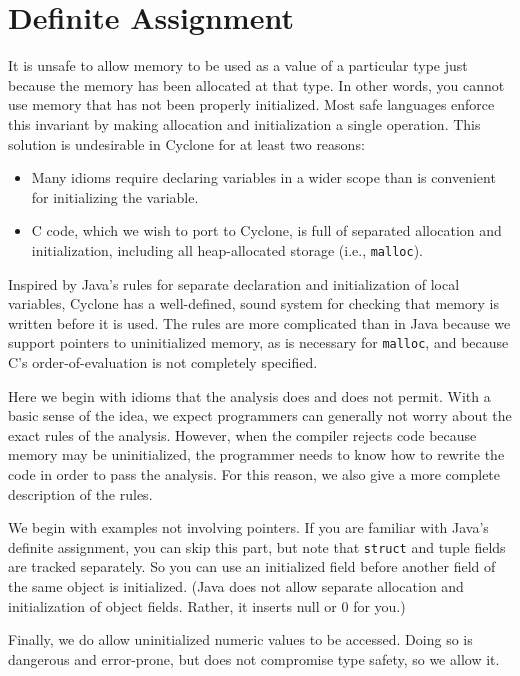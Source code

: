 \section{Definite Assignment}
\label{sec:definite}
 
It is unsafe to allow memory to be used as a value of a particular
type just because the memory has been allocated at that type.  In
other words, you cannot use memory that has not been properly
initialized.  Most safe languages enforce this invariant by making
allocation and initialization a single operation.  This solution is
undesirable in Cyclone for at least two reasons:
\begin{itemize}
\item Many idioms require declaring variables in a wider scope than is
  convenient for initializing the variable.
\item C code, which we wish to port to Cyclone, is full of separated
  allocation and initialization, including all heap-allocated storage
  (i.e., \texttt{malloc}).
\end{itemize}

Inspired by Java's rules for separate declaration and initialization
of local variables, Cyclone has a well-defined, sound system for
checking that memory is written before it is used.  The rules are more
complicated than in Java because we support pointers to uninitialized
memory, as is necessary for \texttt{malloc}, and because C's
order-of-evaluation is not completely specified.

Here we begin with idioms that the analysis does and does not permit.
With a basic sense of the idea, we expect programmers can generally
not worry about the exact rules of the analysis.  However, when the
compiler rejects code because memory may be uninitialized, the
programmer needs to know how to rewrite the code in order to pass the
analysis.  For this reason, we also give a more complete description
of the rules.

We begin with examples not involving pointers.  If you are familiar
with Java's definite assignment, you can skip this part, but note that
\texttt{struct} and tuple fields are tracked separately.  So you can use
an initialized field before another field of the same object is
initialized.  (Java does not allow separate allocation and
initialization of object fields.  Rather, it inserts null or 0 for
you.)

Finally, we do allow uninitialized numeric values to be accessed.
Doing so is dangerous and error-prone, but does not compromise type
safety, so we allow it.

